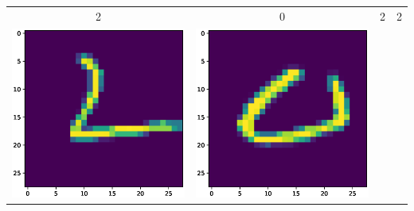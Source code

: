 \documentclass{article}
\begin{document}
\begin{tabular}{cccc}
\\ \hline 
2 & 0 & 2 & 2\\
\includegraphics[scale=.1]{fig/MNIST_392_2_0_392_2.eps} &
\includegraphics[scale=.1]{fig/MNIST_392_2_1_161_0.eps}&

\end{tabular}
\end{document}
